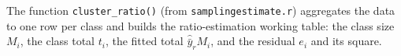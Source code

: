 \documentclass[
  letterpaper,
  DIV=11,
  numbers=noendperiod]{scrreprt}
\newenvironment{Shaded}{\begin{snugshade}}{\end{snugshade}}
\newcommand{\AttributeTok}[1]{\textcolor[rgb]{0.40,0.45,0.13}{#1}}
\newcommand{\DecValTok}[1]{\textcolor[rgb]{0.68,0.00,0.00}{#1}}
\newcommand{\FunctionTok}[1]{\textcolor[rgb]{0.28,0.35,0.67}{#1}}
\newcommand{\NormalTok}[1]{\textcolor[rgb]{0.00,0.23,0.31}{#1}}
\newcommand{\OtherTok}[1]{\textcolor[rgb]{0.00,0.23,0.31}{#1}}
\newcommand{\SpecialCharTok}[1]{\textcolor[rgb]{0.37,0.37,0.37}{#1}}
\newcommand{\StringTok}[1]{\textcolor[rgb]{0.13,0.47,0.30}{#1}}
\renewcommand{\[}{\begin{equation}}
\renewcommand{\]}{\end{equation}}
\begin{document}
The function \texttt{cluster\_ratio()} (from
\texttt{samplingestimate.r}) aggregates the data to one row per class
and builds the ratio-estimation working table: the class size \(M_i\),
the class total \(t_i\), the fitted total \(\hat{\bar y}_r M_i\), and
the residual \(e_i\) and its square.

\begin{Shaded}
\end{Shaded}
\end{document}
